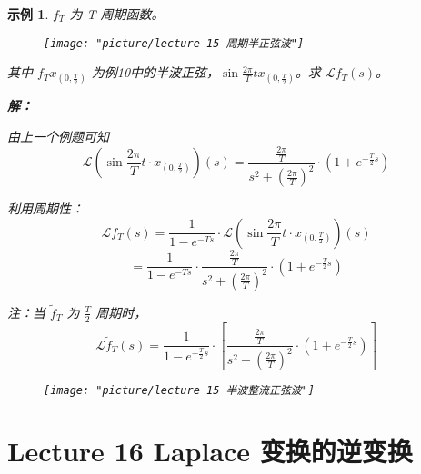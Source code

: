 \documentclass[linespread=1.5,openany]{book}%
\theoremstyle{plain}
\newtheorem{example}[theorem]{示例}
\begin{document}
{{{{{{								%
								\begin{example}
									$f_T$ 为 T 周期函数。\\
									\begin{figure}[h]
										\centering
										\texttt{[image: "picture/lecture 15 周期半正弦波"]}
										\caption{}
										\label{fig:lecture-15-周期半正弦波}
									\end{figure}
									其中 $f_T x_{(0, \frac{T}{2})}$ 为例10中的半波正弦，$\sin \frac{2\pi}{T} t x_{(0, \frac{T}{2})}$。求 $\mathcal{L} f_T(s)$。
									
									
									
									
									\textbf{解：}
									
									由上一个例题可知
									\[
									\mathcal{L}\left(\sin\frac{2\pi}{T}t \cdot x_{(0, \frac{T}{2})}\right)(s) = \frac{\frac{2\pi}{T}}{s^2 + \left(\frac{2\pi}{T}\right)^2} \cdot \left(1 + e^{-\frac{T}{2} s}\right)
									\]
									
									利用周期性：
									\[
									\mathcal{L} f_T(s) = \frac{1}{1 - e^{-T s}} \cdot \mathcal{L}\left(\sin\frac{2\pi}{T} t \cdot x_{(0, \frac{T}{2})}\right)(s)
									\]
									\[
									= \frac{1}{1 - e^{-T s}} \cdot \frac{\frac{2\pi}{T}}{s^2 + \left(\frac{2\pi}{T}\right)^2} \cdot \left(1 + e^{-\frac{T}{2} s}\right)
									\]
									
									注：当 $\tilde{f}_T$ 为 $\frac{T}{2}$ 周期时，
									\[
									\mathcal{L} \tilde{f}_T(s) = \frac{1}{1 - e^{-\frac{T}{2} s}} \cdot \left[ \frac{\frac{2\pi}{T}}{s^2 + \left(\frac{2\pi}{T}\right)^2} \cdot \left(1 + e^{-\frac{T}{2} s}\right) \right]
									\]
									
									
									\begin{figure}[h]
										\centering
										\texttt{[image: "picture/lecture 15 半波整流正弦波"]}
										\caption{}
										\label{fig:lecture-15-半波整流正弦波}
									\end{figure}
									
									
									
								\end{example}
								
							} %
							
							
						} %
						
						
						\part{Lecture 16 Laplace 变换的逆变换}
						
}}}}
\end{document}
